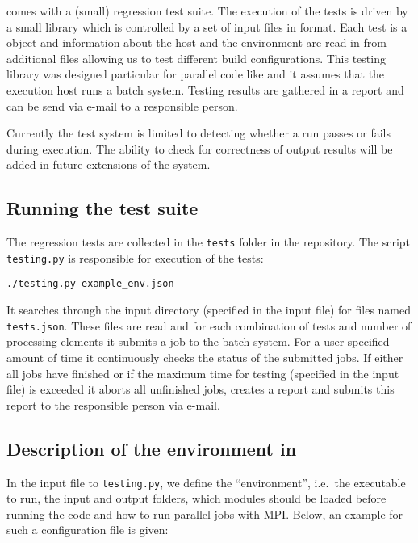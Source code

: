 
\MACI comes with a (small) regression test suite. The execution of the tests is driven by a small \PYTHON library which is controlled by a set of input files in \JSON format. Each test is a \JSON object and information about the host and the environment are read in from additional \JSON files allowing us to test different build configurations. This testing library was designed particular for parallel code like \MACI and it assumes that the execution host runs a batch system. Testing results are gathered in a report and can be send via e-mail to a responsible person.\newline

Currently the test system is limited to detecting whether a run passes or fails during execution. The ability to check for correctness of output results will be added in future extensions of the system.\newline

\subsection{Running the test suite}

The regression tests are collected in the \lstinline[style=SHELL]|tests| folder in the \MACI repository. The script \lstinline[style=SHELL]|testing.py| is responsible for execution of the tests:

\begin{lstlisting}[style=SHELL]
./testing.py example_env.json
\end{lstlisting}


It searches through the input directory (specified in the input file) for files named \lstinline[style=SHELL]|tests.json|. These files are read and for each combination of tests and number of processing elements it submits a job to the batch system. For a user specified amount of time it continuously checks the status of the submitted jobs. If either all jobs have finished or if the maximum time for testing (specified in the input file) is exceeded it aborts all unfinished jobs, creates a report and submits this report to the responsible person via e-mail.


\subsection{Description of the environment in \JSON}

In the input file to \lstinline[style=SHELL]|testing.py|, we define the ``environment'', i.e.~the executable to run, the input and output folders, which modules should be loaded before running the code and how to run parallel jobs with MPI. Below, an example for such a configuration file is given:

